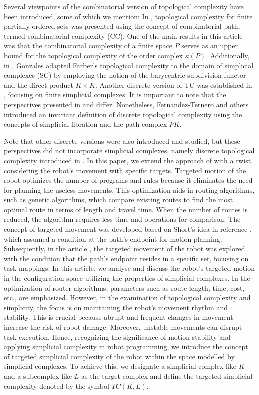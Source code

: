 \documentclass[preprint,11pt %
]{hjm1}
\theoremstyle{definition}
\begin{document}
Several viewpoints of the combinatorial version of topological complexity have been introduced, some of which we mention: In \cite{Combi}, topological complexity for finite partially ordered sets was presented using the concept of combinatorial path, termed combinatorial complexity (CC). One of the main results in this article was that the combinatorial complexity of a finite space $P$ serves as an upper bound for the topological complexity of the order complex $\kappa (P)$. Additionally, in \cite{Simp}, Gonzales adapted Farber's topological complexity to the domain of simplicial complexes (SC) by employing the notion of the barycentric subdivision functor and the direct product $K\times K$. Another discrete version of TC was established in \cite{dis}, focusing on finite simplicial complexes. It is important to note that the perspectives presented in \cite{dis} and \cite{Simp} differ.
Nonetheless, Fernandez-Ternero and others \cite{sim} introduced an invariant definition of discrete topological complexity using the concepts of simplicial fibration and the path complex $PK$.

Note that other discrete versions were also introduced and studied, but these perspectives did not incorporate simplicial complexes, namely discrete topological complexity introduced in \cite{Has}.
 In this paper, we extend the approach of \cite{dis} with a twist, considering the robot's movement with specific targets. Targeted motion of the robot optimizes the number of programs and rules because it eliminates the need for planning the useless movements. 
This optimization aids in routing algorithms, such as genetic algorithms, which compare existing routes to find the most optimal route in terms of length and travel time. When the number of routes is reduced, the algorithm requires less time and operations for comparison. The concept of targeted movement was developed based on Short's idea in reference \cite{rel}, which assumed a condition at the path's endpoint for motion planning. Subsequently, in the article \cite{aghil}, the targeted movement of the robot was explored with the condition that the path's endpoint resides in a specific set, focusing on task mappings. In this article, we analyse and discuss the robot's targeted motion in the configuration space utilizing the properties of simplicial complexes.
In the optimization of router algorithms, parameters such as route length, time, cost, etc., are emphasized. However, in the examination of topological complexity and simplicity, the focus is on maintaining the robot's movement rhythm and stability. This is crucial because abrupt and frequent changes in movement increase the risk of robot damage. Moreover, unstable movements can disrupt task execution. Hence, recognizing the significance of motion stability and applying simplicial complexity in robot programming, we introduce the concept of targeted simplicial complexity of the robot within the space modelled by simplicial complexes. To achieve this, we designate a simplicial complex like $K$ and a subcomplex like $L$ as the target complex and define the targeted simplicial complexity denoted by the symbol $TC(K,L)$.
\end{document}

